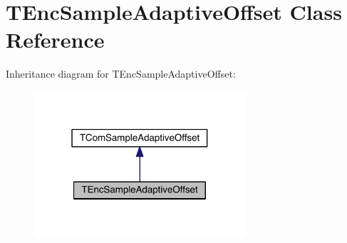 \hypertarget{class_t_enc_sample_adaptive_offset}{}\section{T\+Enc\+Sample\+Adaptive\+Offset Class Reference}
\label{class_t_enc_sample_adaptive_offset}


Inheritance diagram for T\+Enc\+Sample\+Adaptive\+Offset\+:
\nopagebreak
\begin{figure}[H]
\begin{center}
\leavevmode
\includegraphics[width=223pt]{da/de6/class_t_enc_sample_adaptive_offset__inherit__graph}
\end{center}
\end{figure}


